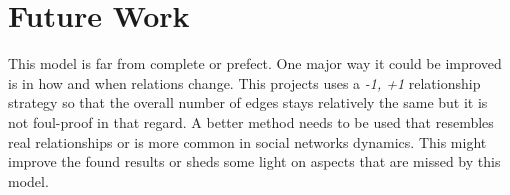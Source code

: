 \section{Future Work}
This model is far from complete or prefect.
One major way it could be improved is in how and when relations change.
This projects uses a \textit{-1, +1} relationship strategy so that the overall number of edges stays relatively the same but it is not foul-proof in that regard.
A better method needs to be used that resembles real relationships or is more common in social networks dynamics.
This might improve the found results or sheds some light on aspects that are missed by this model.
